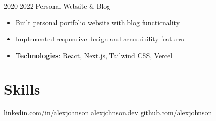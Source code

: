 \documentclass[12pt,letter,sans]{moderncv/moderncv}
\newenvironment{floatbottom}{\par\vspace*{\fill}}{\clearpage}
\begin{document}
\cventry
  {2020-2022}
  {Personal Website \& Blog}{}{}{}{%
  \begin{itemize}
    \item Built personal portfolio website with blog functionality
    \item Implemented responsive design and accessibility features
    \item \textbf{Technologies}: React, Next.js, Tailwind CSS, Vercel
  \end{itemize}
}


\section{Skills}


\begin{floatbottom}
  \small
    \begin{center}
      {\faLinkedin} {\url{linkedin.com/in/alexjohnson}} \quad \quad {\faGlobe} {\url{alexjohnson.dev}} \quad \quad {\faGithub} {\url{github.com/alexjohnson}}
     \end{center}
\end{floatbottom}
\end{document}
